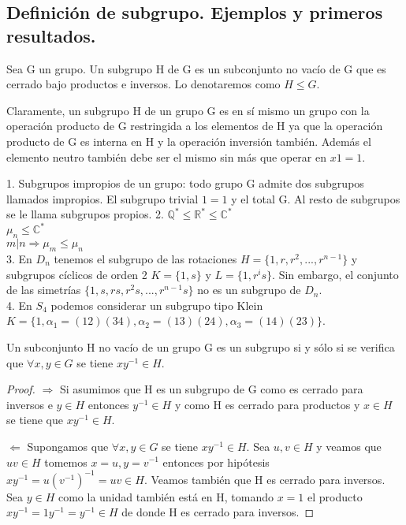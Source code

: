 \subsection{Definición de subgrupo. Ejemplos y primeros resultados.}

\begin{definition}
Sea G un grupo. Un subgrupo H de G es un subconjunto no vacío de G que es cerrado bajo productos e inversos. Lo denotaremos como $H \le G$.
\end{definition}

Claramente, un subgrupo H de un grupo G es en sí mismo un grupo con la operación producto de G restringida a los elementos de H ya que la operación producto de G es interna en H y la operación inversión también. Además el elemento neutro también debe ser el mismo sin más que operar en $x 1 = 1$.

\begin{example}
1. Subgrupos impropios de un grupo: todo grupo G admite dos subgrupos llamados impropios. El subgrupo trivial $1 = {1}$ y el total G. Al resto de subgrupos se le llama subgrupos propios.
2. $\mathbb{Q}^{*} \le \mathbb{R}^{*} \le \mathbb{C}^{*}$\\
$\mu_n \le \mathbb{C}^{*}$\\
$m|n \Rightarrow \mu_m \le \mu_n$\\
3. En $D_n$ tenemos el subgrupo de las rotaciones $H = \{1,r,r^2,...,r^{n-1}\}$ y subgrupos cíclicos de orden 2 $K = \{1,s\}$ y $L = \{1,r^is\}$. Sin embargo, el conjunto de las simetrías $\{1,s,rs,r^2s,...,r^{n-1}s\}$ no es un subgrupo de $D_n$.\\
4. En $S_4$ podemos considerar un subgrupo tipo Klein $K = \{1,\alpha_1 = (12)(34),\alpha_2=(13)(24),\alpha_3=(14)(23)\}$.
\end{example}

\begin{proposition}\label{proposition:criterio-subgrupo}
Un subconjunto H no vacío de un grupo G es un subgrupo si y sólo si se verifica que
$\forall x,y \in G$ se tiene $xy^{-1} \in H$.
\end{proposition}

\begin{proof}
$\Rightarrow$ Si asumimos que H es un subgrupo de G como es cerrado para inversos e $y \in H$ entonces $y^{-1} \in H$ y como H es cerrado para productos y $x \in H$ se tiene que $xy^{-1} \in H$.

$\Leftarrow$ Supongamos que $\forall x,y \in G$ se tiene $xy^{-1} \in H$. Sea $u,v \in H$ y veamos que $uv \in H$ tomemos $x = u,y = v^{-1}$ entonces por hipótesis $xy^{-1} = u(v^{-1})^{-1} = uv \in H$. Veamos también que H es cerrado para inversos. Sea $y \in H$ como la unidad también está en H, tomando $x = 1$ el producto $xy^{-1} = 1y^{-1} = y^{-1} \in H$ de donde H es cerrado para inversos.
\end{proof}

